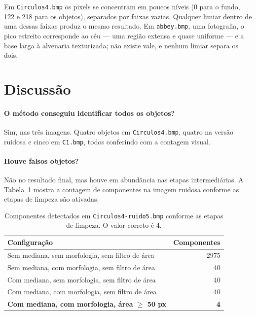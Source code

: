 \documentclass[12pt,a4paper]{article}
\begin{document}
Em \texttt{Circulos4.bmp} os pixels se concentram em poucos níveis (0 para o
fundo, 122 e 218 para os objetos), separados por faixas vazias. Qualquer
limiar dentro de uma dessas faixas produz o mesmo resultado. Em
\texttt{abbey.bmp}, uma fotografia, o pico estreito corresponde ao céu --- uma
região extensa e quase uniforme --- e a base larga à alvenaria texturizada;
não existe vale, e nenhum limiar separa os dois.

\section{Discussão}
\label{sec:discussao}

\paragraph{O método conseguiu identificar todos os objetos?} Sim, nas três
imagens. Quatro objetos em \texttt{Circulos4.bmp}, quatro na versão ruidosa e
cinco em \texttt{C1.bmp}, todos conferindo com a contagem visual.

\paragraph{Houve falsos objetos?} Não no resultado final, mas houve em
abundância nas etapas intermediárias. A Tabela~\ref{tab:falsos} mostra a
contagem de componentes na imagem ruidosa conforme as etapas de limpeza são
ativadas.

\begin{table}[H]
\centering
\begin{tabular}{lr}
\toprule
\textbf{Configuração} & \textbf{Componentes} \\
\midrule
Sem mediana, sem morfologia, sem filtro de área & 2975 \\
Sem mediana, com morfologia, sem filtro de área & 40 \\
Com mediana, sem morfologia, sem filtro de área & 40 \\
Com mediana, com morfologia, sem filtro de área & 40 \\
\textbf{Com mediana, com morfologia, área $\geq$ 50 px} & \textbf{4} \\
\bottomrule
\end{tabular}
\caption{Componentes detectados em \texttt{Circulos4-ruido5.bmp} conforme as
etapas de limpeza. O valor correto é 4.}
\label{tab:falsos}
\end{table}
\end{document}
